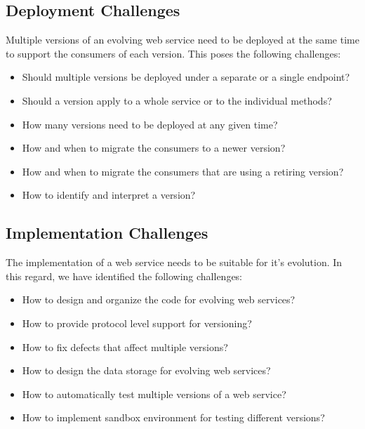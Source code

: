 \documentclass[runningheads,a4paper]{llncs}
\begin{document}
\subsection{Deployment Challenges} %
\label{sub:deployment_challenges}

Multiple versions of an evolving web service need to be deployed at the same time to support the consumers of each version. This poses the following challenges:
\begin{itemize}
  \item Should multiple versions be deployed under a separate or a single endpoint?
  \item Should a version apply to a whole service or to the individual methods?
  \item How many versions need to be deployed at any given time?
  \item How and when to migrate the consumers to a newer version?
  \item How and when to migrate the consumers that are using a retiring version?
  \item How to identify and interpret a version?
\end{itemize}


\subsection{Implementation Challenges} %
\label{sub:implementation_challenges}

The implementation of a web service needs to be suitable for it’s evolution. In this regard, we have identified the following challenges:
\begin{itemize}
  \item How to design and organize the code for evolving web services?
  \item How to provide protocol level support for versioning?
  \item How to fix defects that affect multiple versions?
  \item How to design the data storage for evolving web services?
  \item How to automatically test multiple versions of a web service?
  \item How to implement sandbox environment for testing different versions?
\end{itemize}

\end{document}
